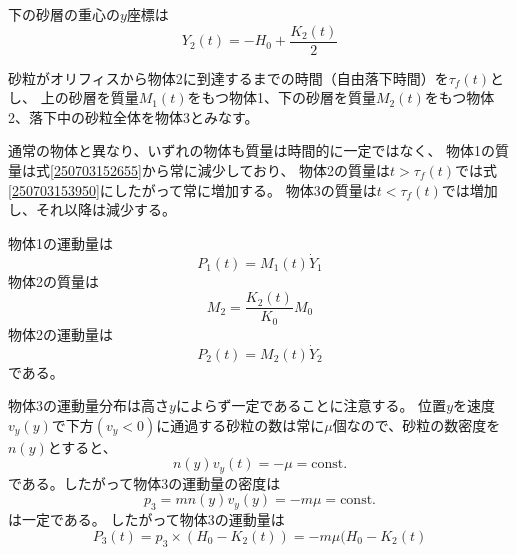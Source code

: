 \documentclass[]{article}
\begin{document}
\color{black}

下の砂層の重心の$y$座標は
\begin{equation} \label{250703154424} 
   Y_2(t) = -H_0 + \frac{K_2(t)}{2} 
\end{equation}



砂粒がオリフィスから物体2に到達するまでの時間（自由落下時間）を$\tau_f(t)$とし、
上の砂層を質量$M_1(t)$をもつ物体1、下の砂層を質量$M_2(t)$をもつ物体2、落下中の砂粒全体を物体3とみなす。


通常の物体と異なり、いずれの物体も質量は時間的に一定ではなく、
物体1の質量は式\eqref{250703152655}から常に減少しており、
物体2の質量は$t>\tau_f(t)$では式\eqref{250703153950}にしたがって常に増加する。
物体3の質量は$t<\tau_f(t)$では増加し、それ以降は減少する。


物体1の運動量は
\begin{equation} \label{250917102959} 
   P_1(t)  = M_1(t) \dot{Y}_1 
\end{equation}
物体2の質量は
\begin{equation} \label{250917184641} 
   M_2 = \frac{K_2(t)}{K_0} M_0
\end{equation}
物体2の運動量は
\begin{equation} \label{250917103019} 
   P_2(t) = M_2(t)\dot{Y}_2  
\end{equation}
である。


物体3の運動量分布は高さ$y$によらず一定であることに注意する。
位置$y$を速度$v_y(y)$で下方$(v_y<0)$に通過する砂粒の数は常に$\mu$個なので、砂粒の数密度を$n(y)$とすると、
\begin{equation} \label{250917101402} 
   n(y) v_y(t) = -\mu = \text{const.}
\end{equation}
である。したがって物体3の運動量の密度は
\begin{equation} \label{250917102631} 
   p_3 = mn(y)v_y(y)= -m \mu = \text{const.}
\end{equation}
は一定である。
したがって物体3の運動量は
\begin{equation} \label{250917102719} 
   P_3(t) = p_3 \times (H_0 - K_2(t)) = -m\mu(H_0-K_2(t)
\end{equation}
\end{document}
